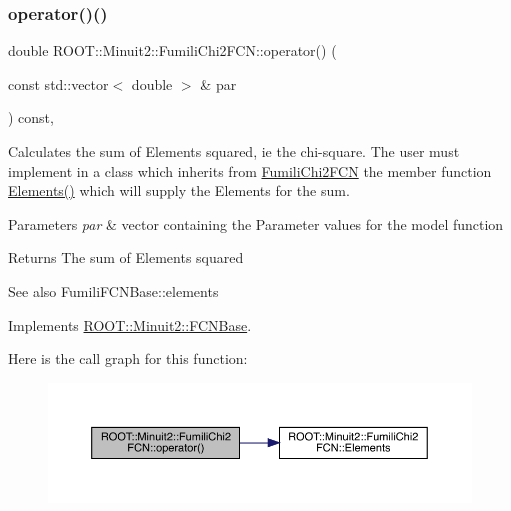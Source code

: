 \subsubsection{\texorpdfstring{operator()()}{operator()()}\hspace{0.1cm}{\footnotesize\ttfamily [1/2]}}
{\footnotesize\ttfamily double R\+O\+O\+T\+::\+Minuit2\+::\+Fumili\+Chi2\+F\+C\+N\+::operator() (\begin{DoxyParamCaption}\item[{const std\+::vector$<$ double $>$ \&}]{par }\end{DoxyParamCaption}) const\hspace{0.3cm}{\ttfamily [inline]}, {\ttfamily [virtual]}}

Calculates the sum of Elements squared, ie the chi-\/square. The user must implement in a class which inherits from \mbox{\hyperlink{classROOT_1_1Minuit2_1_1FumiliChi2FCN}{Fumili\+Chi2\+F\+CN}} the member function \mbox{\hyperlink{classROOT_1_1Minuit2_1_1FumiliChi2FCN_a25cc8dcc2eff831b3c0a94bf5413c2cd}{Elements()}} which will supply the Elements for the sum.


\begin{DoxyParams}{Parameters}
{\em par} & vector containing the Parameter values for the model function\\
\hline
\end{DoxyParams}
\begin{DoxyReturn}{Returns}
The sum of Elements squared
\end{DoxyReturn}
\begin{DoxySeeAlso}{See also}
Fumili\+F\+C\+N\+Base\+::elements 
\end{DoxySeeAlso}


Implements \mbox{\hyperlink{classROOT_1_1Minuit2_1_1FCNBase_ae4a86bd94d0d0f5ca6fc8f8ab2bb43cd}{R\+O\+O\+T\+::\+Minuit2\+::\+F\+C\+N\+Base}}.

Here is the call graph for this function\+:
\nopagebreak
\begin{figure}[H]
\begin{center}
\leavevmode
\includegraphics[width=350pt]{d3/df0/classROOT_1_1Minuit2_1_1FumiliChi2FCN_ae7b2c2080162c0b946cf54090b712716_cgraph}
\end{center}
\end{figure}
\mbox{\label{classROOT_1_1Minuit2_1_1FumiliChi2FCN_ae7b2c2080162c0b946cf54090b712716}} 
